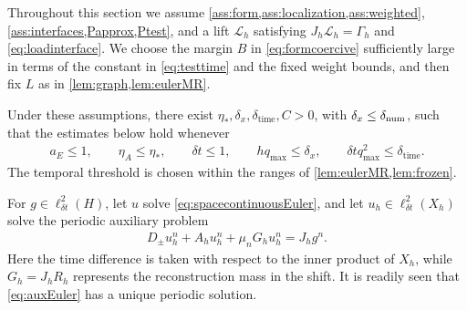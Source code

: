 \documentclass[print,wide,eng]{draft}
\begin{document}
Throughout this section we assume \cref{ass:form,ass:localization,ass:weighted}, \cref{ass:interfaces,Papprox,Ptest}, and a lift $\mathcal L_h$ satisfying $J_h\mathcal L_h=\Gamma_h$ and \cref{eq:loadinterface}. We choose the margin $B$ in \cref{eq:formcoercive} sufficiently large in terms of the constant in \cref{eq:testtime} and the fixed weight bounds, and then fix $L$ as in \cref{lem:graph,lem:eulerMR}.

Under these assumptions, there exist $\eta_*,\delta_x,\delta_{\mathrm{time}},C>0$, with $\delta_x\leq\delta_{\rm num}$, such that the estimates below hold whenever\vspace{-2mm}
%
\begin{align*}
a_E\leq1,\qquad \eta_A\leq\eta_*,\qquad {\delta t}\leq1,\qquad
hq_{\max}\leq\delta_x,\qquad {\delta t}q_{\max}^2\leq\delta_{\mathrm{time}}.
\end{align*}
%
The temporal threshold is chosen within the ranges of \cref{lem:eulerMR,lem:frozen}.

For $g\in\ell_{\delta t}^2(H)$, let $u$ solve \cref{eq:spacecontinuousEuler}, and let $u_h\in\ell_{\delta t}^2(X_h)$ solve the periodic auxiliary problem
%
\begin{align}\label{eq:auxEuler}
D_\pm u_h^n+A_hu_h^n+\mu_nG_hu_h^n=J_hg^n.
\end{align}
%
Here the time difference is taken with respect to the inner product of $X_h$, while $G_h=J_hR_h$ represents the reconstruction mass in the shift.
It is readily seen that \cref{eq:auxEuler} has a unique periodic solution.
\end{document}
